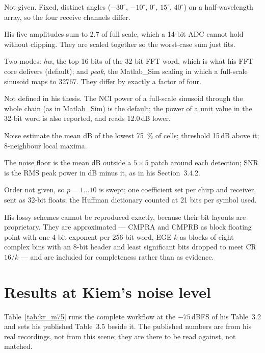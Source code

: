 \begin{description}[leftmargin=!,labelwidth=30mm,style=nextline,font=\normalfont\bfseries]
\item[Target angles] Not given. Fixed, distinct angles
($-30^\circ$, $-10^\circ$, $0^\circ$, $15^\circ$, $40^\circ$) on a
half-wavelength array, so the four receive channels differ.
\item[Amplitudes] His five amplitudes sum to 2.7 of full scale, which a 14-bit
ADC cannot hold without clipping. They are scaled together so the worst-case
sum just fits.
\item[FX16 scaling] Two modes: \emph{hw}, the top 16 bits of the 32-bit FFT
word, which is what his FFT core delivers (default); and \emph{peak}, the
Matlab\_Sim scaling in which a full-scale sinusoid maps to 32767. They differ by
exactly a factor of four.
\item[0\,dBFS] Not defined in his thesis. The NCI power of a full-scale
sinusoid through the whole chain (as in Matlab\_Sim) is the default; the power
of a unit value in the 32-bit word is also reported, and reads 12.0\,dB lower.
\item[Detector] Noise estimate the mean dB of the lowest \SI{75}{\percent} of
cells; threshold 15\,dB above it; 8-neighbour local maxima.
\item[Noise floor and SNR] The noise floor is the mean dB outside a
$5\times5$ patch around each detection; SNR is the RMS peak power in dB minus it,
as in his Section~3.4.2.
\item[LPC-Huffman of Meucci and Mancuso] Order not given, so $p = 1 \ldots 10$ is swept;
one coefficient set per chirp and receiver, sent as 32-bit floats; the
Huffman dictionary counted at 21 bits per symbol used.
\end{description}

\noindent
His lossy schemes cannot be reproduced exactly, because their bit layouts are
proprietary. They are approximated --- CMPRA and CMPRB as block floating point
with one 4-bit exponent per 256-bit word, EGE-$k$ as blocks of eight complex
bins with an 8-bit header and least significant bits dropped to meet CR
$16/k$ --- and are included for completeness rather than as evidence.

\section{Results at Kiem's noise level}
\label{sec:kr_m75}

Table~\ref{tab:kr_m75} runs the complete workflow at the $-75$\,dBFS of his
Table~3.2 and sets his published Table~3.5 beside it. The published numbers are
from his real recordings, not from this scene; they are there to be read
against, not matched.

